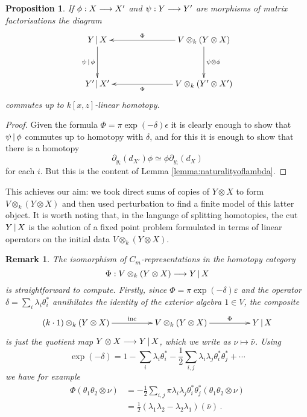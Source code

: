 \documentclass[english,letter paper,12pt,leqno]{article}
\newtheorem{proposition}[theorem]{Proposition}
\theoremstyle{example}
\newtheorem{remark}[theorem]{Remark}
\numberwithin{equation}{section}
\def\be{\begin{equation}}
\def\ee{\end{equation}}
\begin{document}
\begin{proposition}\label{prop:naturality_main_thm} If $\phi: X \longrightarrow X'$ and $\psi: Y \longrightarrow Y'$ are morphisms of matrix factorisations the diagram
\begin{equation}\label{eq:final_finite_naturality}
\xymatrix@C+4pc@R+1pc{
Y \l X \ar[d]_-{\psi \l \phi} & V \otimes_k ( Y \otimes X )\ar[l]_-{\Phi} \ar[d]^-{\psi \otimes \phi}\\
Y' \l X' & V \otimes_k ( Y' \otimes X' )\ar[l]^-{\Phi}
}
\end{equation}
commutes up to $k[x,z]$-linear homotopy.
\end{proposition}
\begin{proof}
Given the formula $\Phi = \pi \exp(-\delta) \epsilon$ it is clearly enough to show that $\psi \,|\, \phi$ commutes up to homotopy with $\delta$, and for this it is enough to show that there is a homotopy
\[
\partial_{y_i}(d_{X'}) \phi \simeq \phi \partial_{y_i}(d_X)
\]
for each $i$. But this is the content of Lemma \ref{lemma:naturalityoflambda}.
\end{proof}

This achieves our aim: we took direct sums of copies of $Y \otimes X$ to form $V \otimes_k( Y \otimes X )$ and then used perturbation to find a finite model of this latter object. It is worth noting that, in the language of splitting homotopies, the cut $Y \,|\, X$ is the solution of a fixed point problem formulated in terms of linear operators on the initial data $V \otimes_k( Y \otimes X )$. 

\begin{remark} The isomorphism of $C_m$-representations in the homotopy category
\[
\Phi: V \otimes_k (Y \otimes X) \longrightarrow Y \,|\, X
\]
is straightforward to compute. Firstly, since $\Phi = \pi \exp(-\delta) \varepsilon$ and the operator $\delta = \sum_i \lambda_i \theta_i^*$ annihilates the identity of the exterior algebra $1 \in V$, the composite
\be
\xymatrix@C+2pc{
( k \cdot 1 ) \otimes_k ( Y \otimes X ) \ar[r]^-{\operatorname{inc}} & V \otimes_k ( Y \otimes X ) \ar[r]^-{\Phi} & Y \l X
}
\ee
is just the quotient map $Y \otimes X \longrightarrow Y \,|\, X$, which we write as $\nu \mapsto \bar{\nu}$. Using
\[
\exp(-\delta) = 1 - \sum_i \lambda_i \theta_i^* - \frac{1}{2}\sum_{i,j} \lambda_i \lambda_j \theta_i^* \theta_j^* + \cdots
\]
we have for example
\begin{align*}
\Phi( \theta_1 \theta_2 \otimes \nu ) &= - \frac{1}{2} \sum_{i,j} \pi \lambda_i \lambda_j  \theta_i^* \theta_j^*( \theta_1 \theta_2 \otimes \nu )\\
&= \frac{1}{2}\left( \lambda_1 \lambda_2 -\lambda_2 \lambda_1 \right)( \bar{\nu} )\,.
\end{align*}
\end{remark}
\end{document}
